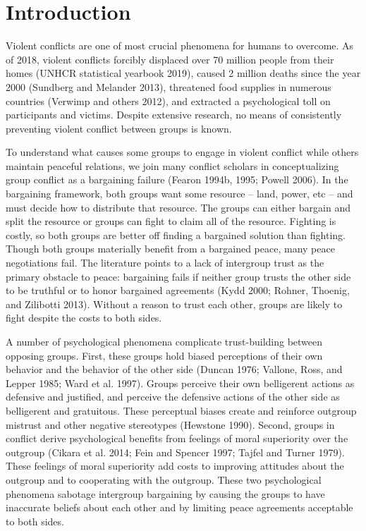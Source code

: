 \documentclass[11pt]{article}
\begin{document}
\hypertarget{introduction}{%
\section{Introduction}\label{introduction}}

Violent conflicts are one of most crucial phenomena for humans to
overcome. As of 2018, violent conflicts forcibly displaced over 70
million people from their homes (UNHCR statistical yearbook 2019),
caused 2 million deaths since the year 2000 (Sundberg and Melander
2013), threatened food supplies in numerous countries (Verwimp and
others 2012), and extracted a psychological toll on participants and
victims. Despite extensive research, no means of consistently preventing
violent conflict between groups is known.

To understand what causes some groups to engage in violent conflict
while others maintain peaceful relations, we join many conflict scholars
in conceptualizing group conflict as a bargaining failure (Fearon 1994b,
1995; Powell 2006). In the bargaining framework, both groups want some
resource -- land, power, etc -- and must decide how to distribute that
resource. The groups can either bargain and split the resource or groups
can fight to claim all of the resource. Fighting is costly, so both
groups are better off finding a bargained solution than fighting. Though
both groups materially benefit from a bargained peace, many peace
negotiations fail. The literature points to a lack of intergroup trust
as the primary obstacle to peace: bargaining fails if neither group
trusts the other side to be truthful or to honor bargained agreements
(Kydd 2000; Rohner, Thoenig, and Zilibotti 2013). Without a reason to
trust each other, groups are likely to fight despite the costs to both
sides.

A number of psychological phenomena complicate trust-building between
opposing groups. First, these groups hold biased perceptions of their
own behavior and the behavior of the other side (Duncan 1976; Vallone,
Ross, and Lepper 1985; Ward et al. 1997). Groups perceive their own
belligerent actions as defensive and justified, and perceive the
defensive actions of the other side as belligerent and gratuitous. These
perceptual biases create and reinforce outgroup mistrust and other
negative stereotypes (Hewstone 1990). Second, groups in conflict derive
psychological benefits from feelings of moral superiority over the
outgroup (Cikara et al. 2014; Fein and Spencer 1997; Tajfel and Turner
1979). These feelings of moral superiority add costs to improving
attitudes about the outgroup and to cooperating with the outgroup. These
two psychological phenomena sabotage intergroup bargaining by causing
the groups to have inaccurate beliefs about each other and by limiting
peace agreements acceptable to both sides.
\end{document}
